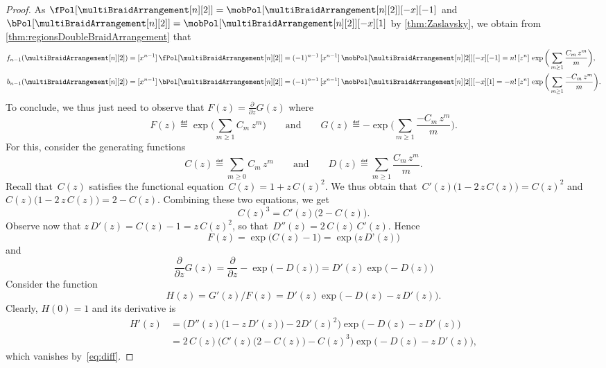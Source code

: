 \begin{proof}
As $\fPol[{\multiBraidArrangement[n][2]}] = \mobPol[{\multiBraidArrangement[n][2]}][-x][-1]$ and $\bPol[{\multiBraidArrangement[n][2]}] = \mobPol[{\multiBraidArrangement[n][2]}][-x][1]$ by \cref{thm:Zaslavsky}, we obtain from \cref{thm:regionsDoubleBraidArrangement} that
\begin{align*}
f_{n-1}(\multiBraidArrangement[n][2]) & = [x^{n-1}] \, \fPol[{\multiBraidArrangement[n][2]}] = (-1)^{n-1} \, [x^{n-1}] \, \mobPol[{\multiBraidArrangement[n][2]}][-x][-1] = n! \, [z^n]  \, \exp \bigg( \sum_{m \ge 1} \frac{C_m \, z^m}{m} \bigg), \\
b_{n-1}(\multiBraidArrangement[n][2]) & = [x^{n-1}] \, \bPol[{\multiBraidArrangement[n][2]}] = (-1)^{n-1} \, [x^{n-1}] \, \mobPol[{\multiBraidArrangement[n][2]}][-x][1] = - n! \, [z^n]  \, \exp \bigg( \sum_{m \ge 1} \frac{- C_m \, z^m}{m} \bigg).
\end{align*}
To conclude, we thus just need to observe that
\(
F(z) = \frac{\partial}{\partial z} G(z)
\)
where
\[
F(z) \eqdef \exp \bigg( \sum_{m \ge 1} C_m \, z^m \bigg)
\qquad\text{and}\qquad
G(z) \eqdef - \exp \bigg( \sum_{m \ge 1} \frac{- C_m \, z^m}{m} \bigg).
\]
For this, consider the generating functions
\[
C(z) \eqdef \sum_{m \ge 0} C_m \, z^m
\qquad\text{and}\qquad
D(z) \eqdef \sum_{m \ge 1} \frac{C_m \, z^m}{m}.
\]
Recall that~$C(z)$ satisfies the functional equation~$C(z) = 1 + z \, C(z)^2$.
We thus obtain that~$C'(z) \big( 1 - 2 \, z \, C(z) \big) = C(z)^2$ and $C(z) \big( 1 - 2 \, z \, C(z) \big) = 2 - C(z)$.
Combining these two equations, we get
\begin{equation}
\label{eq:diff}
C(z)^3 = C'(z) \big( 2 - C(z) \big).
\end{equation}
Observe now that $z \, D'(z) = C(z) - 1 = z \, C(z)^2$, so that~$D''(z) = 2 \, C(z) \, C'(z)$.
Hence
\[
F(z) = \exp \big( C(z) - 1 \big) = \exp \big( z \, D’(z) \big)
\]
and
\[
\frac{\partial}{\partial z} G(z) = \frac{\partial}{\partial z}  - \exp \big( -D(z) \big) = D'(z) \exp \big( -D(z) \big)
\]
Consider the function
\[
H(z) = G'(z) / F(z) = D'(z) \exp \big( -D(z) - z \, D'(z) \big).
\]
Clearly, $H(0) = 1$ and its derivative is
\begin{align*}
H'(z)
& = \Big( D''(z) \big(1 - z \, D'(z) \big) - 2 D'(z)^2 \Big) \exp \big( -D(z) - z \, D'(z) \big) \\
& = 2 \, C(z) \Big( C'(z) \big( 2 - C(z) \big) - C(z)^3 \Big) \exp \big( - D(z) - z \, D'(z) \big),
\end{align*}
which vanishes by~\eqref{eq:diff}.

\end{proof}

